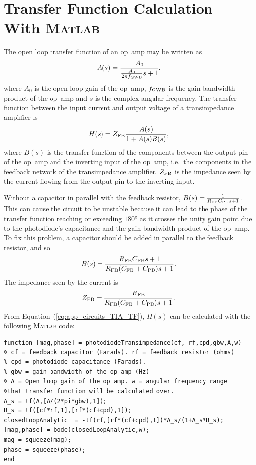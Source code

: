 \section{Transfer Function Calculation With \textsc{Matlab}}
\label{sec:appendix_TIA_TF}
The open loop transfer function of an op~amp may be written as
\begin{equation}
A(s) = \frac{A_0}{\frac{A_0}{2\pi f_{\rm{GWB}}}s +1},
\end{equation}
where $A_0$ is the open-loop gain of the op~amp, $f_{\rm{GWB}}$ is the gain-bandwidth product of the op~amp and $s$ is the complex angular frequency. The transfer function between the input current and output voltage of a transimpedance amplifier is
\begin{equation}
H(s) = Z_{\rm{FB}}\frac{A(s)}{1+A(s)B(s)},
\label{eq:app_circuits_TIA_TF}
\end{equation}
where $B(s)$ is the transfer function of the components between the output pin of the op~amp and the inverting input of the op~amp, i.e.~the components in the feedback network of the transimpedance amplifier. $Z_{\rm{FB}}$ is the impedance seen by the current flowing from the output pin to the inverting input.
\par
Without a capacitor in parallel with the feedback resistor, $B(s) = \frac{1}{R_{\rm{FB}}C_{\rm{PD}}s+1}$. This can cause the circuit to be unstable because it can lead to the phase of the transfer function reaching or exceeding $180\si{\degree}$ as it crosses the unity gain point due to the photodiode's capacitance and the gain bandwidth product of the op~amp. To fix this problem, a capacitor should be added in parallel to the feedback resistor, and so 
\begin{equation}
B(s) = \frac{R_{\rm{FB}}C_{\rm{FB}}s + 1}{R_{\rm{FB}}(C_{\rm{FB}}+C_{\rm{PD}})s + 1}.
\end{equation}
The impedance seen by the current is 
\begin{equation}
Z_{\rm{FB}} = \frac{R_{\rm{FB}}}{R_{\rm{FB}}(C_{\rm{FB}}+C_{\rm{PD}})s + 1}.
\end{equation}
From Equation~(\ref{eq:app_circuits_TIA_TF}), $H(s)$ can be calculated with the following \textsc{Matlab} code:
\begin{lstlisting}
function [mag,phase] = photodiodeTransimpedance(cf, rf,cpd,gbw,A,w)
% cf = feedback capacitor (Farads). rf = feedback resistor (ohms)
% cpd = photodiode capacitance (Farads). 
% gbw = gain bandwidth of the op amp (Hz) 
% A = Open loop gain of the op amp. w = angular frequency range 
%that transfer function will be calculated over. 
A_s = tf(A,[A/(2*pi*gbw),1]);
B_s = tf([cf*rf,1],[rf*(cf+cpd),1]);
closedLoopAnalytic  = -tf(rf,[rf*(cf+cpd),1])*A_s/(1+A_s*B_s);
[mag,phase] = bode(closedLoopAnalytic,w);
mag = squeeze(mag);
phase = squeeze(phase);
end
\end{lstlisting}